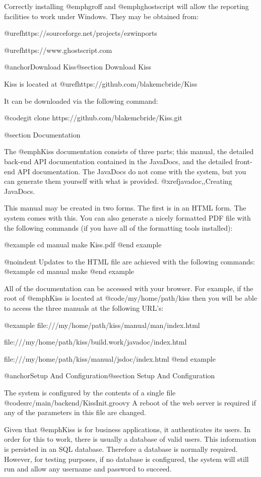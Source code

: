 Correctly installing @emph{groff} and @emph{ghostscript} will allow the
reporting facilities to work under Windows.  They may be obtained from:

@uref{https://sourceforge.net/projects/ezwinports}

@uref{https://www.ghostscript.com}


@anchor{Download Kiss}@section Download Kiss

Kiss is located at @uref{https://github.com/blakemcbride/Kiss}

It can be downloaded via the following command:

@code{git clone https://github.com/blakemcbride/Kiss.git}

@section Documentation

The @emph{Kiss} documentation consists of three parts; this manual,
the detailed back-end API documentation contained in the JavaDocs, and
the detailed front-end API documentation.  The JavaDocs do not come
with the system, but you can generate them yourself with what is
provided.  @xref{javadoc,,Creating JavaDocs}.

This manual may be created in two forms.  The first is in an HTML
form.  The system comes with this.  You can also generate a nicely
formatted PDF file with the following commands (if you have all of the
formatting tools installed):

@example
cd manual
make Kiss.pdf
@end example

@noindent
Updates to the HTML file are achieved with the following commands:
@example
cd manual
make
@end example

All of the documentation can be accessed with your browser.  For
example, if the root of @emph{Kiss} is located at
@code{/my/home/path/kiss} then you will be able to access the three
manuals at the following URL's:

@example
file:///my/home/path/kiss/manual/man/index.html

file:///my/home/path/kiss/build.work/javadoc/index.html

file:///my/home/path/kiss/manual/jsdoc/index.html
@end example

@anchor{Setup And Configuration}@section Setup And Configuration

The system is configured by the contents of a single file
@code{src/main/backend/KissInit.groovy} A reboot of the web server
is required if any of the parameters in this file are changed.

Given that @emph{Kiss} is for business applications, it authenticates its
users.  In order for this to work, there is usually a database of valid
users.  This information is persisted in an SQL database.  Therefore a
database is normally required.  However, for testing purposes, if no
database is configured, the system will still run and allow any
username and password to succeed.

